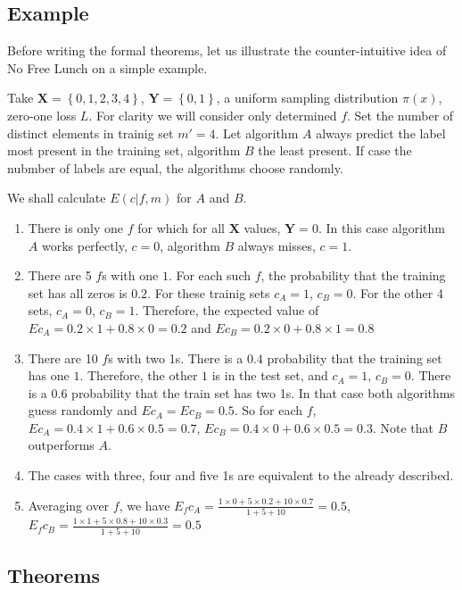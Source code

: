 \documentclass[a4paper]{article}
\begin{document}
\subsection{Example}
Before writing the formal theorems, let us illustrate the
counter-intuitive idea of No Free Lunch on a simple example.

Take $\mathbf{X} = \left\{0,1,2,3,4\right\}$,
$\mathbf{Y} = \left\{0,1\right\}$, a uniform sampling distribution
$\pi(x)$, zero-one loss $L$. For clarity we will consider only
determined $f$. Set the number of distinct elements in trainig set
$m' = 4$. Let algorithm $A$ always predict the label most present in
the training set, algorithm $B$ the least present. If case the nubmber
of labels are equal, the algorithms choose randomly.

We shall calculate $E(c|f,m)$ for $A$ and $B$.
\begin{enumerate}
\item There is only one $f$ for which for all $\mathbf{X}$ values,
  $\mathbf{Y}=0$. In this case algorithm $A$ works perfectly, $c=0$,
  algorithm $B$ always misses, $c=1$.
\item There are 5 $f$s with one $1$. For each such $f$, the
  probability that the training set has all zeros is $0.2$. For these
  trainig sets $c_A=1$, $c_B=0$. For the other 4 sets, $c_A=0$,
  $c_B=1$. Therefore, the expected value of
  $E c_A = 0.2\times 1 + 0.8 \times 0 = 0.2$ and
  $E c_B = 0.2\times 0 + 0.8 \times 1 = 0.8$
\item There are 10 $f$s with two 1s. There is a $0.4$ probability that
  the training set has one $1$. Therefore, the other $1$ is in the
  test set, and $c_A = 1$, $c_B = 0$. There is a $0.6$ probability
  that the train set has two 1s. In that case both algorithms guess
  randomly and $E c_A = E c_B = 0.5$. So for each $f$,
  $E c_A = 0.4\times 1 + 0.6\times 0.5 = 0.7$,
  $E c_B = 0.4\times 0 + 0.6\times 0.5 = 0.3$. Note that $B$
  outperforms $A$.
\item The cases with three, four and five 1s are equivalent to the
  already described.
\item Averaging over $f$, we have
  $E_f c_A = \frac{1\times 0 + 5\times 0.2 + 10\times 0.7}{1+5+10} =
  0.5$,
  $E_f c_B = \frac{1\times 1 + 5\times 0.8 + 10\times 0.3}{1+5+10} =
  0.5$
\end{enumerate}

\subsection{Theorems}
\end{document}
